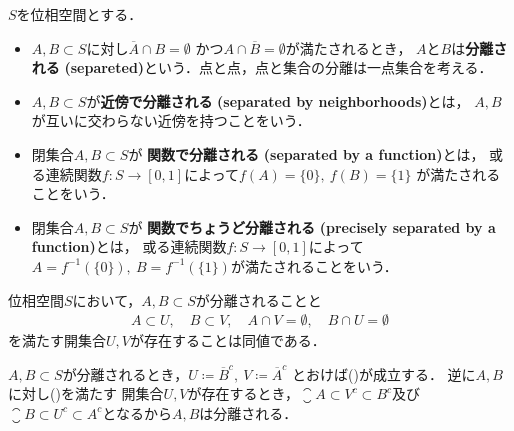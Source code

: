 	\begin{screen}
		\begin{dfn}[位相的に識別可能・分離]
			$S$を位相空間とする．
			\begin{itemize}
				\item $A,B \subset S$に対し$\overline{A} \cap B = \emptyset$
					かつ$A \cap \overline{B} = \emptyset$が満たされるとき，
					$A$と$B$は{\bf 分離される}
					{\bf (separeted)}という．点と点，点と集合の分離は一点集合を考える．
				\item $A,B \subset S$が{\bf 近傍で分離される}
					{\bf (separated by neighborhoods)}とは，
					$A,B$が互いに交わらない近傍を持つことをいう．
				\item 閉集合$A,B \subset S$が
					{\bf 関数で分離される}
					{\bf (separated by a function)}とは，
					或る連続関数$f:S \longrightarrow [0,1]$によって$f(A) = \{0\},\ f(B) = \{1\}$
					が満たされることをいう．
				\item 閉集合$A,B \subset S$が
					{\bf 関数でちょうど分離される}
					{\bf (precisely separated by a function)}とは，
					或る連続関数$f:S \longrightarrow [0,1]$によって
					$A = f^{-1}(\{0\}),\ B = f^{-1}(\{1\})$が満たされることをいう．
			\end{itemize}
		\end{dfn}
	\end{screen}
	
	\begin{screen}
		\begin{thm}[分離される集合は他方を含まない近傍を持つ]
		\label{thm:the_equivalent_condition_of_separatedness}
			位相空間$S$において，$A,B \subset S$が分離されることと
			\begin{align}
				A \subset U,\quad B \subset V,\quad 
				A \cap V = \emptyset,
				\quad B \cap U = \emptyset
				\label{eq:thm_the_equivalent_condition_of_separatedness}
			\end{align}
			を満たす開集合$U,V$が存在することは同値である．
		\end{thm}
	\end{screen}
	
	\begin{prf}
		$A,B \subset S$が分離されるとき，$U \coloneqq \overline{B}^c,\ V \coloneqq \overline{A}^c$
		とおけば()が成立する．
		逆に$A,B$に対し()を満たす
		開集合$U,V$が存在するとき，$\closure{A} \subset V^c \subset B^c$及び
		$\closure{B} \subset U^c \subset A^c$となるから$A,B$は分離される．
		\QED
	\end{prf}
	
